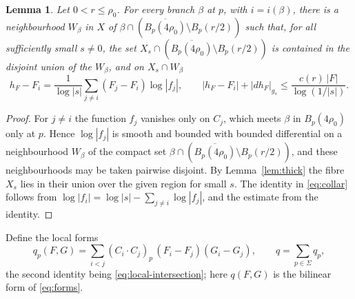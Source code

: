 \documentclass[11pt]{amsart}
\newtheorem{lemma}[theorem]{Lemma}
\theoremstyle{definition}
\theoremstyle{remark}
\begin{document}
\begin{lemma}\label{lem:collar}
Let $0<r\le\rho_0$. For every branch $\beta$ at $p$, with $i=i(\beta)$,
there is a neighbourhood $W_\beta$ in $X$ of
$\beta\cap(\overline{B_p(4\rho_0)}\setminus B_p(r/2))$ such that, for all
sufficiently small $s\ne0$, the set
$X_s\cap(\overline{B_p(4\rho_0)}\setminus B_p(r/2))$ is contained in the
disjoint union of the $W_\beta$, and on $X_s\cap W_\beta$
\begin{equation}\label{eq:collar}
 h_F-F_i=\frac1{\log|s|}\sum_{j\ne i}(F_j-F_i)\log|f_j|,\qquad
 |h_F-F_i|+|dh_F|_{g_s}\le\frac{c(r)\,|F|}{\log(1/|s|)} .
\end{equation}
\end{lemma}
\begin{proof}
For $j\ne i$ the function $f_j$ vanishes only on $C_j$, which meets
$\beta$ in $B_p(4\rho_0)$ only at $p$. Hence $\log|f_j|$ is smooth and
bounded with bounded differential on a neighbourhood $W_\beta$ of the
compact set $\beta\cap(\overline{B_p(4\rho_0)}\setminus B_p(r/2))$, and
these neighbourhoods may be taken pairwise disjoint. By
Lemma~\ref{lem:thick} the fibre $X_s$ lies in their union over the given
region for small $s$. The identity in \eqref{eq:collar} follows from
$\log|f_i|=\log|s|-\sum_{j\ne i}\log|f_j|$, and the estimate from the
identity.
\end{proof}

Define the local forms
\begin{equation}\label{eq:qp}
 q_p(F,G)=\sum_{i<j}(C_i\cdot C_j)_p\,(F_i-F_j)(G_i-G_j),
 \qquad q=\sum_{p\in\Sigma}q_p ,
\end{equation}
the second identity being \eqref{eq:local-intersection}; here $q(F,G)$ is
the bilinear form of \eqref{eq:forms}.
\end{document}
